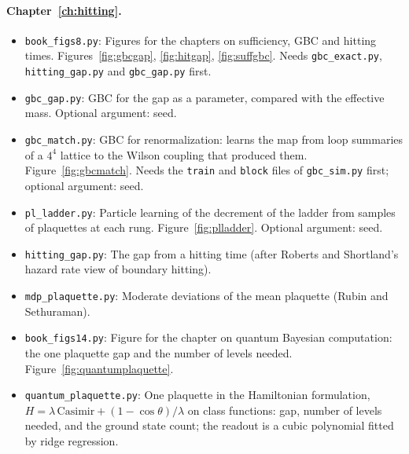\paragraph{Chapter~\ref{ch:hitting}.}\nopagebreak
\begin{itemize}\setlength{\itemsep}{0pt}\setlength{\parskip}{0pt}
\item \texttt{book\_figs8.py}: Figures for the chapters on sufficiency, GBC and hitting times. Figures~\ref{fig:gbcgap}, \ref{fig:hitgap}, \ref{fig:suffgbc}. Needs \texttt{gbc\_exact.py}, \texttt{hitting\_gap.py} and \texttt{gbc\_gap.py} first.
\item \texttt{gbc\_gap.py}: GBC for the gap as a parameter, compared with the effective mass. Optional argument: seed.
\item \texttt{gbc\_match.py}: GBC for renormalization: learns the map from loop summaries of a $4^4$ lattice to the Wilson coupling that produced them. Figure~\ref{fig:gbcmatch}. Needs the \texttt{train} and \texttt{block} files of \texttt{gbc\_sim.py} first; optional argument: seed.
\item \texttt{pl\_ladder.py}: Particle learning of the decrement of the ladder from samples of plaquettes at each rung. Figure~\ref{fig:plladder}. Optional argument: seed.
\item \texttt{hitting\_gap.py}: The gap from a hitting time (after Roberts and Shortland's hazard rate view of boundary hitting).
\item \texttt{mdp\_plaquette.py}: Moderate deviations of the mean plaquette (Rubin and Sethuraman).
\item \texttt{book\_figs14.py}: Figure for the chapter on quantum Bayesian computation: the one plaquette gap and the number of levels needed. Figure~\ref{fig:quantumplaquette}.
\item \texttt{quantum\_plaquette.py}: One plaquette in the Hamiltonian formulation, $H=\lambda\,\mathrm{Casimir}+(1-\cos\theta)/\lambda$ on class functions: gap, number of levels needed, and the ground state count; the readout is a cubic polynomial fitted by ridge regression.
\end{itemize}
